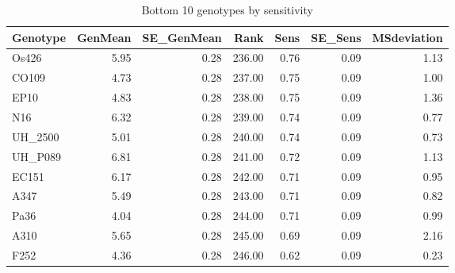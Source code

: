 \documentclass[a4paper,11pt]{article}\usepackage[]{graphicx}\usepackage[]{xcolor}
\begin{document}
\begin{table}[ht]
\begin{flushleft}
\caption{Bottom 10 genotypes by sensitivity} 
\label{bottomEstimates}
\begin{tabular}{lrrrrrr}
  \hline
Genotype & GenMean & SE\_GenMean & Rank & Sens & SE\_Sens & MSdeviation \\ 
  \hline
Os426 & 5.95 & 0.28 & 236.00 & 0.76 & 0.09 & 1.13 \\ 
  CO109 & 4.73 & 0.28 & 237.00 & 0.75 & 0.09 & 1.00 \\ 
  EP10 & 4.83 & 0.28 & 238.00 & 0.75 & 0.09 & 1.36 \\ 
  N16 & 6.32 & 0.28 & 239.00 & 0.74 & 0.09 & 0.77 \\ 
  UH\_2500 & 5.01 & 0.28 & 240.00 & 0.74 & 0.09 & 0.73 \\ 
  UH\_P089 & 6.81 & 0.28 & 241.00 & 0.72 & 0.09 & 1.13 \\ 
  EC151 & 6.17 & 0.28 & 242.00 & 0.71 & 0.09 & 0.95 \\ 
  A347 & 5.49 & 0.28 & 243.00 & 0.71 & 0.09 & 0.82 \\ 
  Pa36 & 4.04 & 0.28 & 244.00 & 0.71 & 0.09 & 0.99 \\ 
  A310 & 5.65 & 0.28 & 245.00 & 0.69 & 0.09 & 2.16 \\ 
  F252 & 4.36 & 0.28 & 246.00 & 0.62 & 0.09 & 0.23 \\ 
   \hline
\end{tabular}
\end{flushleft}
\end{table}

\end{document}
